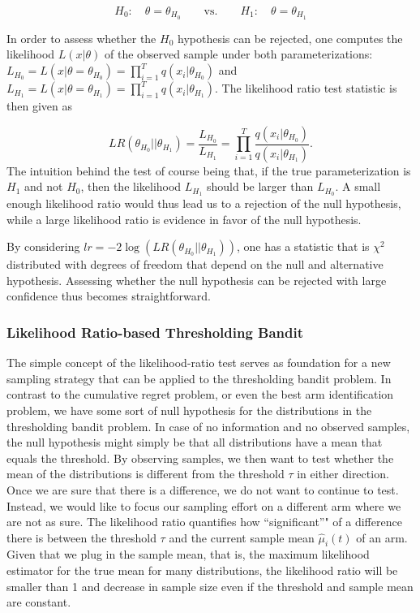 \documentclass[12pt,]{article}
\begin{document}
\[
H_0: \quad \theta = \theta_{H_0} \qquad \text{vs.} \qquad H_1: \quad \theta = \theta_{H_1}
\]

In order to assess whether the \(H_0\) hypothesis can be rejected, one
computes the likelihood \(L(x|\theta)\) of the observed sample under
both parameterizations:
\(L_{H_0} = L(x|\theta = \theta_{H_0}) = \prod_{i=1}^T q(x_i|\theta_{H_0})\)
and
\(L_{H_1} = L(x|\theta = \theta_{H_1}) = \prod_{i=1}^T q(x_i|\theta_{H_1})\).
The likelihood ratio test statistic is then given as

\[
LR(\theta_{H_0}|| \theta_{H_1}) = \frac{L_{H_0}}{L_{H_1}} = \prod_{i=1}^T\frac{q(x_i|\theta_{H_0})}{ q(x_i|\theta_{H_1})}.
\] The intuition behind the test of course being that, if the true
parameterization is \(H_1\) and not \(H_0\), then the likelihood
\(L_{H_1}\) should be larger than \(L_{H_0}\). A small enough likelihood
ratio would thus lead us to a rejection of the null hypothesis, while a
large likelihood ratio is evidence in favor of the null hypothesis.

By considering \(lr = -2\log(LR(\theta_{H_0}|| \theta_{H_1}))\), one has
a statistic that is \(\chi^2\) distributed with degrees of freedom that
depend on the null and alternative hypothesis. Assessing whether the
null hypothesis can be rejected with large confidence thus becomes
straightforward.

\subsubsection{Likelihood Ratio-based Thresholding
Bandit}\label{likelihood-ratio-based-thresholding-bandit}

The simple concept of the likelihood-ratio test serves as foundation for
a new sampling strategy that can be applied to the thresholding bandit
problem. In contrast to the cumulative regret problem, or even the best
arm identification problem, we have some sort of null hypothesis for the
distributions in the thresholding bandit problem. In case of no
information and no observed samples, the null hypothesis might simply be
that all distributions have a mean that equals the threshold. By
observing samples, we then want to test whether the mean of the
distributions is different from the threshold \(\tau\) in either
direction. Once we are sure that there is a difference, we do not want
to continue to test. Instead, we would like to focus our sampling effort
on a different arm where we are not as sure. The likelihood ratio
quantifies how ``significant''" of a difference there is between the
threshold \(\tau\) and the current sample mean \(\hat{\mu}_i(t)\) of an
arm. Given that we plug in the sample mean, that is, the maximum
likelihood estimator for the true mean for many distributions, the
likelihood ratio will be smaller than 1 and decrease in sample size even
if the threshold and sample mean are constant.
\end{document}
